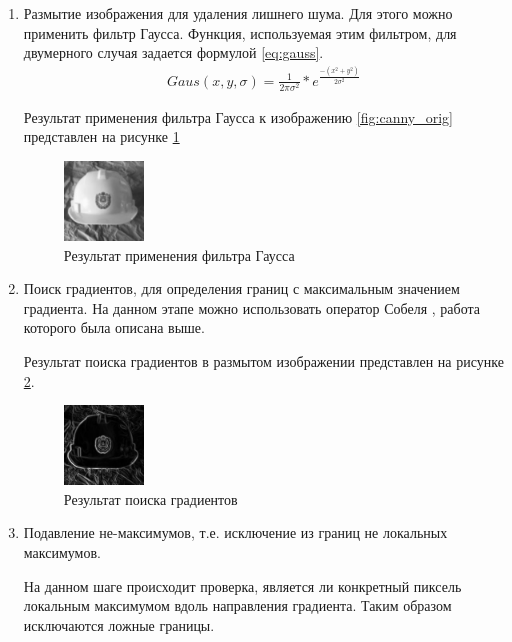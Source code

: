 \begin{enumerate}
	\item Размытие изображения для удаления лишнего шума. Для этого можно применить фильтр Гаусса\cite{shapiro:2001}.
	Функция, используемая этим фильтром, для двумерного случая задается формулой  \ref{eq:gauss}.
	\begin{eqnarray}\label{eq:gauss}
	Gaus(x, y, \sigma) = \frac{1}{2 \pi \sigma^2}*e^{\frac{-(x^2+y^2)}{2\sigma^2}}
	\end{eqnarray}
	
	Результат применения фильтра Гаусса к изображению \ref{fig:canny_orig} представлен на рисунке \ref{fig:canny_smoothed}
	
	\begin{figure}[!h]
		\centering
		\includegraphics[width=0.2\textwidth,keepaspectratio]{figures/ru/bmstu_smoothed}
		\caption{Результат применения фильтра Гаусса}
		\label{fig:canny_smoothed}
	\end{figure}
	\item Поиск градиентов, для определения границ с максимальным значением градиента.
	На данном этапе можно использовать оператор Собеля \cite{Sobel}, работа которого была описана выше.
	
	Результат поиска градиентов в размытом изображении представлен на рисунке \ref{fig:canny_gradient}.
	
	\begin{figure}[!h]
		\centering
		\includegraphics[width=0.2\textwidth,keepaspectratio]{figures/ru/bmstu_gradient}
		\caption{Результат поиска градиентов}
		\label{fig:canny_gradient}
	\end{figure}

	\item Подавление не-максимумов, т.е. исключение из границ не локальных максимумов.
	
	На данном шаге происходит проверка, является ли конкретный пиксель локальным максимумом вдоль направления градиента. Таким образом исключаются ложные границы.
	

\end{enumerate}
